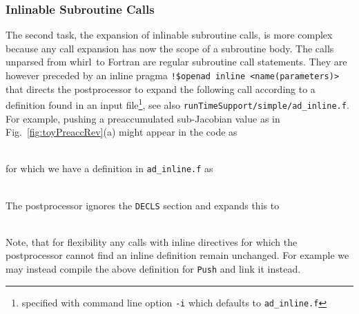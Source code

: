 \documentclass{book}
\newcommand{\saxpy}{saxpy}
\newcommand{\whirl}{whirl}
\newcommand{\code}[1]{{\small\tt{#1}}}
\newcommand{\reffig}[1]{{Fig.~\ref{#1}}}
\begin{document}
\subsubsection{Inlinable Subroutine Calls}\label{sssec:inline}
The second task, the expansion of inlinable subroutine calls, is more complex because 
any call expansion has now the scope of a subroutine body. The calls unparsed from \whirl\ to 
Fortran are regular subroutine call statements. They are however preceded by an inline  pragma
\code{!\$openad inline <name(parameters)>}  
that directs the postprocessor to expand the following call according to a definition 
found in an input file\footnote{
specified with command line option {\tt -i} which defaults to {\tt ad\_inline.f}
}, see also \code{runTimeSupport/simple/ad\_inline.f}.
For example, pushing a preaccumulated sub-Jacobian value as in  \reffig{fig:toyPreaccRev}(a) might appear 
in the code as\\
\hspace*{.05\textwidth}\begin{minipage}{.6\textwidth}
\fontsize{8pt}{9pt}
\end{minipage}\\
for which we have a definition in \code{ad\_inline.f} as \\
\hspace*{.05\textwidth}\begin{minipage}{.6\textwidth}
\fontsize{8pt}{9pt}
\end{minipage}\\
The postprocessor ignores the \code{DECLS} section and  expands this to\\
\hspace*{.05\textwidth}\begin{minipage}{.6\textwidth}
\fontsize{8pt}{9pt}
\end{minipage}\\
Note, that for flexibility 
any calls with inline directives for which the postprocessor cannot find an inline definition remain 
unchanged. For example we may instead compile the above definition for \code{Push} and link 
it instead.
\end{document}
